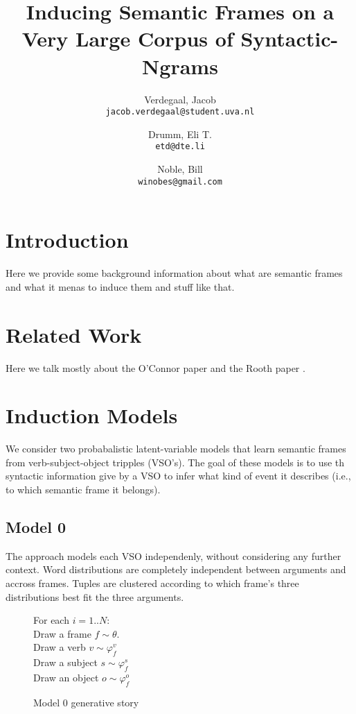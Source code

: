 \documentclass[11pt,twocolumn,DIV=11]{scrartcl}
\author{
    Verdegaal, Jacob\\
    \texttt{jacob.verdegaal@student.uva.nl}
    \and
    Drumm, Eli T.\\
    \texttt{etd@dte.li}
    \and
    Noble, Bill\\
    \texttt{winobes@gmail.com}
}
\title{Inducing Semantic Frames on a Very Large Corpus of Syntactic-Ngrams}
\renewcommand\phi\varphi
\begin{document}
\maketitle


\section{Introduction}
Here we provide some background information about what are semantic frames and 
what it menas to induce them and stuff like that.


\section{Related Work}
Here we talk mostly about the O'Connor paper \citep{oconnor2013} and the Rooth 
paper \citep{rooth1999}.


\section{Induction Models}

We consider two probabalistic latent-variable models that learn semantic frames
from verb-subject-object tripples (VSO's).
The goal of these models is to use th syntactic information give by a VSO to
infer what kind of event it describes (i.e., to which semantic frame it belongs).

\subsection{Model 0}

The approach models each VSO independenly, without considering any further context.
Word distributions are completely independent between arguments and accross frames.
Tuples are clustered according to which frame's three distributions best fit the 
three arguments.

\begin{figure}

    \begin{snugshade}
    \scriptsize
    For each $i = 1..N$:\\
    \hspace*{15pt} Draw a frame $f \sim \theta$.\\
    \hspace*{15pt} Draw a verb $v \sim \phi_f^v$\\
    \hspace*{15pt} Draw a subject $s \sim \phi_f^s$\\
    \hspace*{15pt} Draw an object $o \sim \phi_f^o$
    \end{snugshade}

    

    \caption{Model 0 generative story}
    \label{gen0}

\end{figure}
\end{document}

